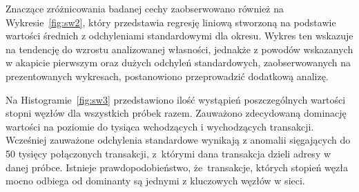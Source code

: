 \documentclass[12pt, oneside, final, openany]{mgr}
\begin{document}
\indent Znaczące zróżnicowania badanej cechy zaobserwowano również na Wykresie~\ref{fig:sw2}, który przedstawia regresję liniową stworzoną na podstawie wartości średnich z odchyleniami standardowymi dla okresu. Wykres ten wskazuje na tendencję do wzrostu analizowanej własności, jednakże z powodów wskazanych w akapicie pierwszym oraz dużych odchyleń standardowych, zaobserwowanych na prezentowanych wykresach, postanowiono przeprowadzić dodatkową analizę.

\indent Na Histogramie~\ref{fig:sw3} przedstawiono ilość wystąpień poszczególnych wartości stopni węzłów dla wszystkich próbek razem. Zauważono zdecydowaną dominację wartości na poziomie do tysiąca wchodzących i wychodzących transakcji. Wcześniej zauważone odchylenia standardowe wynikają z anomalii sięgających do 50 tysięcy połączonych transakcji, z~którymi dana transakcja dzieli adresy w danej próbce. Istnieje prawdopodobieństwo, że~transakcje, których stopień węzła mocno odbiega od dominanty są jednymi z kluczowych węzłów w sieci.
\end{document}
